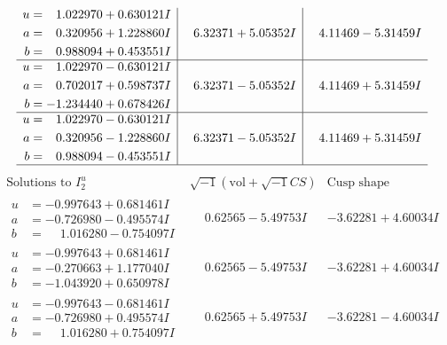 \documentclass[1p]{elsarticle_modified}
\theoremstyle{definition}
\newcommand{\I}{\sqrt{-1}}
\begin{document}
$$\begin{array}{c|c|c}
\begin{aligned}
u &= \phantom{-}1.022970 + 0.630121 I \\
a &= \phantom{-}0.320956 + 1.228860 I \\
b &= \phantom{-}0.988094 + 0.453551 I\end{aligned}
 & \phantom{-}6.32371 + 5.05352 I & \phantom{-}4.11469 - 5.31459 I \\ \hline\begin{aligned}
u &= \phantom{-}1.022970 - 0.630121 I \\
a &= \phantom{-}0.702017 + 0.598737 I \\
b &= -1.234440 + 0.678426 I\end{aligned}
 & \phantom{-}6.32371 - 5.05352 I & \phantom{-}4.11469 + 5.31459 I \\ \hline\begin{aligned}
u &= \phantom{-}1.022970 - 0.630121 I \\
a &= \phantom{-}0.320956 - 1.228860 I \\
b &= \phantom{-}0.988094 - 0.453551 I\end{aligned}
 & \phantom{-}6.32371 - 5.05352 I & \phantom{-}4.11469 + 5.31459 I\\
 \hline 
 \end{array}$$\newpage$$\begin{array}{c|c|c}  
\text{Solutions to }I^u_{2}& \I (\text{vol} + \sqrt{-1}CS) & \text{Cusp shape}\\
 \hline 
\begin{aligned}
u &= -0.997643 + 0.681461 I \\
a &= -0.726980 - 0.495574 I \\
b &= \phantom{-}1.016280 - 0.754097 I\end{aligned}
 & \phantom{-}0.62565 - 5.49753 I & -3.62281 + 4.60034 I \\ \hline\begin{aligned}
u &= -0.997643 + 0.681461 I \\
a &= -0.270663 + 1.177040 I \\
b &= -1.043920 + 0.650978 I\end{aligned}
 & \phantom{-}0.62565 - 5.49753 I & -3.62281 + 4.60034 I \\ \hline\begin{aligned}
u &= -0.997643 - 0.681461 I \\
a &= -0.726980 + 0.495574 I \\
b &= \phantom{-}1.016280 + 0.754097 I\end{aligned}
 & \phantom{-}0.62565 + 5.49753 I & -3.62281 - 4.60034 I \\ \hline\begin{aligned}

\end{aligned}
\end{array}$$
\end{document}
